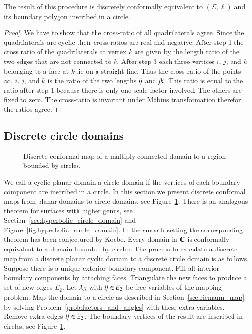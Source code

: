 \documentclass[Thesis]{subfiles}
\begin{document}
\begin{proposition}
The result of this procedure is discretely conformally equivalent to $(\Sigma, \ell)$ and its boundary polygon inscribed in a circle.
\end{proposition}
\begin{proof}
We have to show that the cross-ratio of all quadrilaterals agree. 
Since the quadrilaterals are cyclic their cross-ratios are real and negative.
After step 1 the cross ratio of the quadrilaterals at vertex $k$ are given by the length ratio of the two edges that are not connected to $k$.
After step 3 each three vertices $i$, $j$, and $k$ belonging to a face at $k$ lie on a straight line. 
Thus the cross-ratio of the points $\infty$, $i$, $j$, and $k$ is the ratio of the two lengths $\it ij$ and $\it jk$.
This ratio is equal to the ratio after step 1 because there is only one scale factor involved. 
The others are fixed to zero.
The cross-ratio is invariant under M{\"o}bius transformation therefor the ratios agree.
\end{proof}

\subsection{Discrete circle domains}
\label{sec:circle_domains}

\begin{figure}
\centering
{}
\caption{
Discrete conformal map of a multiply-connected domain to a region bounded by circles.
}
\label{fig:euclidean_circle_domain}
\end{figure}

We call a cyclic planar domain a circle domain if the vertices of each boundary component are inscribed in a circle.
In this section we present discrete conformal maps from planar domains to circle domains, see Figure~\ref{fig:euclidean_circle_domain}.
There is an analogous theorem for surfaces with higher genus, see Section~\ref{sec:hyperbolic_circle_domain} and Figure~\ref{fig:hyperbolic_circle_domain}.
In the smooth setting the corresponding theorem has been conjectured by Koebe. 
Every domain in $\mathbb C$ is conformally equivalent to a domain bounded by circles.
The process to calculate a discrete map from a discrete planar cyclic domain to a discrete circle domain is as follows.
Suppose there is a unique exterior boundary component. Fill all interior boundary components by attaching faces. 
Triangulate the new faces to produce a set of new edges $E_2$. 
Let $\lambda_{\it ij}$ with $\it ij\in E_2$ be free variables of the mapping problem.
Map the domain to a circle as described in Section~\ref{sec:riemann_map} by solving Problem~\ref{prob:factors_and_angles} with these extra variables.
Remove extra edges $\it ij\in E_2$.
The boundary vertices of the result are inscribed in circles, see Figure~\ref{fig:euclidean_circle_domain}.
\end{document}
